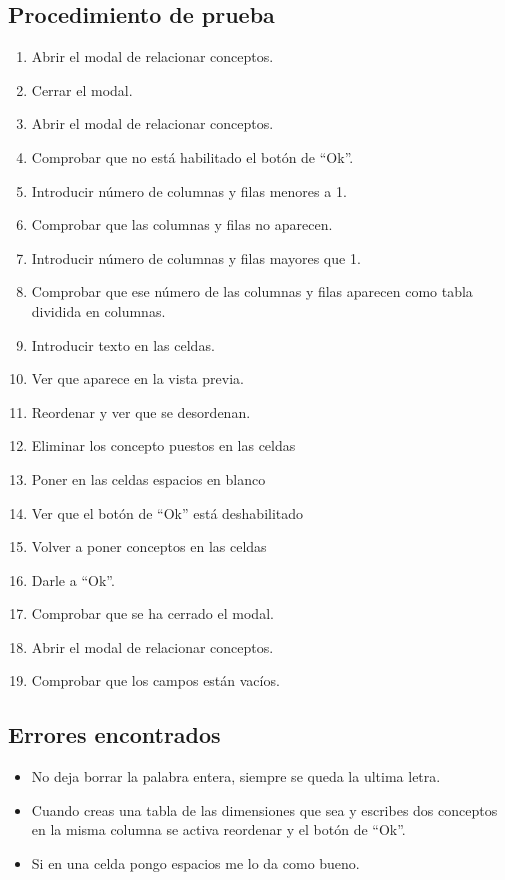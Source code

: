 \subsection{Procedimiento de prueba}
\label{procedimientoPruebas:conceptos}
\begin{enumerate}
    \item Abrir el modal de relacionar conceptos.
    \item Cerrar el modal.
    \item Abrir el modal de relacionar conceptos.
    \item Comprobar que no está habilitado el botón de ``Ok''.
    \item Introducir número de columnas y filas  menores a 1.
    \item Comprobar que las columnas y filas no aparecen.
    \item Introducir número de columnas y filas mayores que 1.
    \item Comprobar que ese número de  las columnas y filas aparecen como tabla dividida en columnas.
    \item Introducir texto en las celdas.
    \item Ver que aparece en la vista previa.
    \item Reordenar y ver que se desordenan.
    \item Eliminar los concepto puestos en las celdas
    \item Poner en las celdas espacios en blanco
    \item Ver que el botón de ``Ok'' está deshabilitado
    \item Volver a poner conceptos en las celdas
    \item Darle a ``Ok''.
    \item Comprobar que se ha cerrado el modal.
    \item Abrir el modal de relacionar conceptos.
    \item Comprobar que los campos están vacíos.

\end{enumerate}


\subsection{Errores encontrados}
\label{errores:pictotra}
\begin{itemize}
    \item No deja borrar la palabra entera, siempre se queda la ultima letra.
    \item Cuando creas una tabla de las dimensiones que sea y escribes dos conceptos en la misma columna se activa reordenar y el botón de ``Ok''.
    \item  Si en una celda pongo espacios me lo da como bueno.

\end{itemize}

